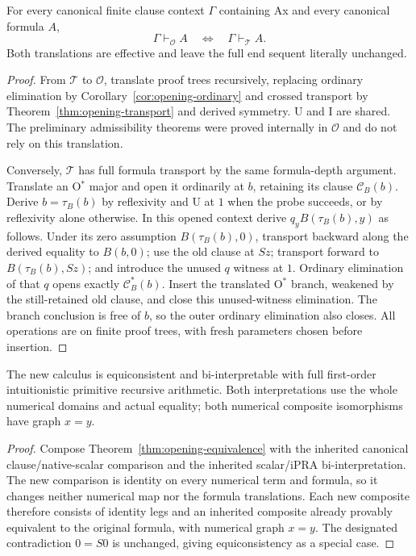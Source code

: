 \begin{theorem}
\label{thm:opening-equivalence}
For every canonical finite clause context $\Gamma$ containing Ax and
every canonical formula $A$,
\[
 \Gamma\vdash_{\mathcal O}A
 \quad\Longleftrightarrow\quad
 \Gamma\vdash_{\mathcal T}A.
\]
Both translations are effective and leave the full end sequent literally
unchanged.
\end{theorem}
\begin{proof}
From $\mathcal T$ to $\mathcal O$, translate proof trees recursively,
replacing ordinary elimination by Corollary~\ref{cor:opening-ordinary}
and crossed transport by Theorem~\ref{thm:opening-transport} and derived
symmetry. U and I are shared. The preliminary admissibility theorems were
proved internally in $\mathcal O$ and do not rely on this translation.

Conversely, $\mathcal T$ has full formula transport by the same
formula-depth argument. Translate an O$^*$ major and open it ordinarily
at $b$, retaining its clause $\mathcal C_B(b)$. Derive
$b=\tau_B(b)$ by reflexivity and U at $1$ when the probe succeeds, or
by reflexivity alone otherwise. In this opened context derive
$q_y B(\tau_B(b),y)$ as follows. Under its zero assumption
$B(\tau_B(b),0)$, transport backward along the derived equality to
$B(b,0)$; use the old clause at $Sz$; transport forward to
$B(\tau_B(b),Sz)$; and introduce the unused $q$ witness at $1$.
Ordinary elimination of that $q$ opens exactly
$\mathcal C^*_B(b)$. Insert the translated O$^*$ branch, weakened by
the still-retained old clause, and close this unused-witness elimination.
The branch conclusion is free of $b$, so the outer ordinary elimination
also closes. All operations are on finite proof trees, with fresh
parameters chosen before insertion.
\end{proof}

\begin{corollary}
\label{cor:opening-ipra}
The new calculus is equiconsistent and bi-interpretable with full
first-order intuitionistic primitive recursive arithmetic. Both
interpretations use the whole numerical domains and actual equality;
both numerical composite isomorphisms have graph $x=y$.
\end{corollary}
\begin{proof}
Compose Theorem~\ref{thm:opening-equivalence} with the inherited canonical
clause/native-scalar comparison and the inherited scalar/iPRA
bi-interpretation. The new comparison is identity on every numerical term
and formula, so it changes neither numerical map nor the formula
translations. Each new composite therefore consists of identity legs
and an inherited composite already provably equivalent to the original
formula, with numerical graph $x=y$. The designated contradiction
$0=S0$ is unchanged, giving equiconsistency as a special case.
\end{proof}

